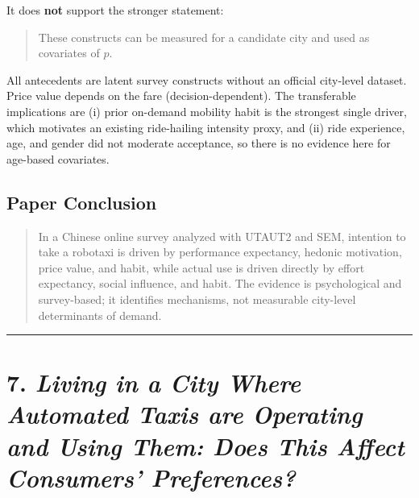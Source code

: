 \documentclass[10pt,a4paper]{article}
\begin{document}
It does \textbf{not} support the stronger statement:

\begin{quote}
These constructs can be measured for a candidate city and used as covariates of $p$.
\end{quote}

All antecedents are latent survey constructs without an official city-level dataset. Price value depends on the fare (decision-dependent). The transferable implications are (i) prior on-demand mobility habit is the strongest single driver, which motivates an existing ride-hailing intensity proxy, and (ii) ride experience, age, and gender did not moderate acceptance, so there is no evidence here for age-based covariates.

\hypertarget{paper-conclusion-5}{%
\subsection{Paper Conclusion}\label{paper-conclusion-5}}

\begin{quote}
In a Chinese online survey analyzed with UTAUT2 and SEM, intention to take a robotaxi is driven by performance expectancy, hedonic motivation, price value, and habit, while actual use is driven directly by effort expectancy, social influence, and habit. The evidence is psychological and survey-based; it identifies mechanisms, not measurable city-level determinants of demand.
\end{quote}

\begin{center}\rule{0.5\linewidth}{0.5pt}\end{center}

\hypertarget{living-in-a-city-where-automated-taxis-are-operating}{%
\section{\texorpdfstring{7. \emph{Living in a City Where Automated Taxis are Operating and Using Them: Does This Affect Consumers' Preferences?}}{7. Living in a City Where Automated Taxis are Operating and Using Them: Does This Affect Consumers' Preferences?}}\label{living-in-a-city-where-automated-taxis-are-operating}}
\end{document}
